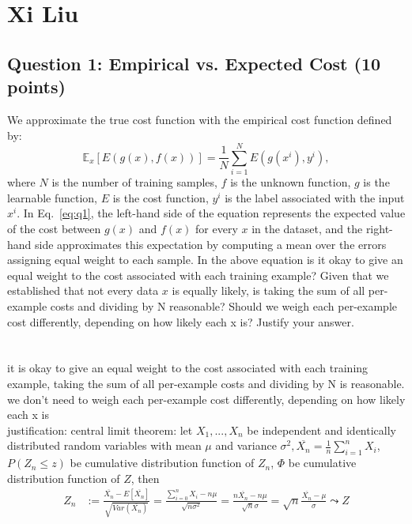 \documentclass{article}
\begin{document}
\section*{Xi Liu}

\subsection*{Question 1: 
Empirical vs. Expected Cost (10 points)} 
We approximate the true cost 
function with the empirical 
cost function defined by: 
\begin{equation}
\mathbb{E}_{x}\left[E(g(x), f(x))\right] = 
\frac{1}{N} \sum_{i=1}^N E(g(x^i), y^i),
\label{eq:q1}
\end{equation}
where $N$ is the number of training samples, $f$ is the unknown function, $g$ is the learnable function, $E$ is the cost function, $y^i$ is the label associated with the input $x^i$. In Eq.~\ref{eq:q1}, the left-hand side of the equation represents the expected value of the cost between $g(x)$ and $f(x)$ for every $x$ in the dataset, and the right-hand side approximates this expectation by computing a mean over the errors assigning equal weight to each sample. In the above equation is it okay to give an equal weight to the cost associated with each training example? Given that we established that not every data $x$ is
equally likely, is taking the sum of all per-example
costs and dividing by N reasonable? Should we weigh
each per-example cost differently, depending on 
how likely each x is? Justify your answer.\\
\\
\\
it is okay to give an equal weight to the cost associated with each training example, taking the sum of all per-example
costs and dividing by N is reasonable. we don't need to weigh
each per-example cost differently, depending on how likely each x is\\
justification: central limit theorem: let $X_1, ..., X_n$ be independent and identically distributed random variables with mean $\mu$ and variance $\sigma ^ 2, \overline{X_n} = \frac{1}{n} \sum_{i = 1} ^ n X_i$, $P(Z_n \leq z)$ be cumulative distribution function of $Z_n$, $\Phi$ be cumulative distribution function of $Z$, then
\begin{align*}
Z_n &:= \frac{\overline{X_n} - E[\overline{X_n}]}{\sqrt{Var(\overline{X_n})}}
= \frac{\sum_{i = 0} ^ n X_i - n\mu}{\sqrt{n\sigma ^ 2}} = \frac{n\overline{X_n} - n\mu}{\sqrt{n}\sigma} = \sqrt{n}\frac{\overline{X_n} - \mu}{\sigma} \leadsto Z
\end{align*}
\end{document}
